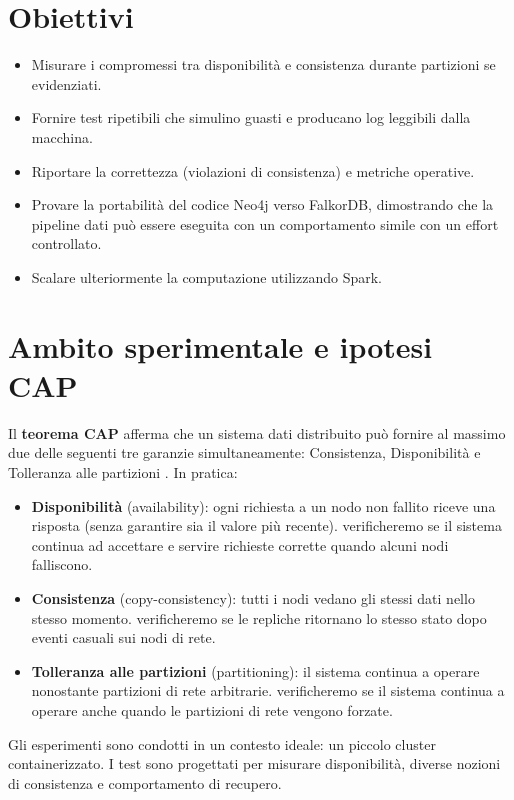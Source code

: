 \documentclass{article}
\begin{document}
\section{Obiettivi}
\begin{itemize}
    \item Misurare i compromessi tra disponibilità e consistenza durante partizioni se evidenziati.
    \item Fornire test ripetibili che simulino guasti e producano log leggibili dalla macchina.
    \item Riportare la correttezza (violazioni di consistenza) e metriche operative.
    \item Provare la portabilità del codice Neo4j verso FalkorDB, %
    dimostrando che la pipeline dati può essere eseguita con un comportamento simile con un effort controllato.
    \item Scalare ulteriormente la computazione utilizzando Spark.
\end{itemize}

\section{Ambito sperimentale e ipotesi CAP}

Il \textbf{teorema CAP} afferma che un sistema dati distribuito può fornire al massimo %
due delle seguenti tre garanzie simultaneamente: Consistenza, Disponibilità e Tolleranza %
alle partizioni \cite{Brewer2000}.
In pratica: \cite{itwiki:149387620}

\begin{itemize}
  \item \textbf{Disponibilità} (availability): ogni richiesta a un nodo non fallito riceve una risposta (senza garantire sia il valore più recente). %
verificheremo se il sistema continua ad accettare e servire richieste corrette quando alcuni nodi falliscono.
  \item \textbf{Consistenza} (copy-consistency): tutti i nodi vedano gli stessi dati nello stesso momento. %
verificheremo se le repliche ritornano lo stesso stato dopo eventi casuali sui nodi di rete.
  \item \textbf{Tolleranza alle partizioni} (partitioning): il sistema continua a operare nonostante partizioni di rete arbitrarie. %
verificheremo se il sistema continua a operare anche quando le partizioni di rete vengono forzate.
\end{itemize}

Gli esperimenti sono condotti in un contesto ideale: un piccolo cluster containerizzato. %
I test sono progettati per misurare disponibilità, diverse nozioni di consistenza e comportamento di recupero.
\end{document}
